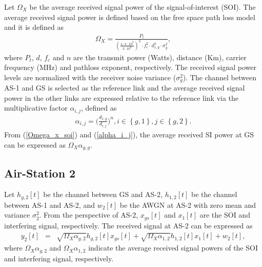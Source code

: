 Let $\Omega_{X}$ be the average received signal power of the signal-of-interest (SOI). The average received signal power is defined based on the free space path loss model and it is defined as
\begin{eqnarray} \label{Omega_x_soi}
\Omega_{X} = \frac{P_t}{{\left(\frac{4\cdot\pi\cdot{10^9}}{3\cdot10^8}\right)^2}{\cdot}f_{c}^2{\cdot}d_{1,g}^{n}{\cdot}\sigma_g^2},
\end{eqnarray}
where $P_{t}$, $d$, $f_{c}$ and $n$ are the transmit power (Watts), distance (Km), carrier frequency (MHz) and pathloss exponent, respectively. The received signal power levels are normalized with the receiver noise variance ($\sigma_g^2$). The channel between AS-1 and GS is selected as the reference link and the average received signal power in the other links are expressed relative to the reference link via the multiplicative factor $\alpha_{i,j}$, defined as
\begin{eqnarray} \label{alpha_i_j}
\alpha_{i,j} = \bigg(\frac{d_{1,g}}{d_{i,j}}\bigg)^n, i\in\left\{g,1\right\}, j\in\left\{g,2\right\}.
\end{eqnarray}
From (\ref{Omega_x_soi}) and (\ref{alpha_i_j}), the average received SI power at GS can be expressed as $\Omega_X\alpha_{g,g}$. 

\subsection{Air-Station 2}

Let $h_{g,2}[t]$ be the channel between GS and AS-2, $h_{1,2}[t]$ be the channel between AS-1 and AS-2, and $w_{2}[t]$ be the AWGN at AS-2 with zero mean and variance $\sigma^2_2$. From the perspective of AS-2, $x_{gs}[t]$ and $x_1[t]$ are the SOI and interfering signal, respectively. The received signal at AS-2 can be expressed as
\begin{eqnarray} \label{y_as2}
y_{2}[t] & = & \sqrt{\Omega_{X}\alpha_{g,2}}h_{g,2}[t]x_{gs}[t] + \sqrt{\Omega_{X}\alpha_{1,2}}h_{1,2}[t]x_{1}[t] + w_{2}[t],
\end{eqnarray}
where $\Omega_{X}\alpha_{g,2}$ and $\Omega_{X}\alpha_{1,2}$ indicate the average received signal powers of the SOI and interfering signal, respectively. 

